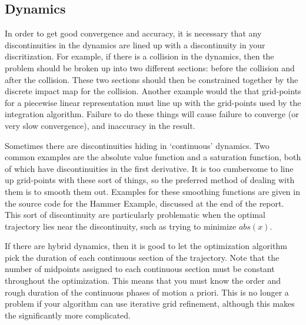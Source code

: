 \subsection {Dynamics}

In order to get good convergence and accuracy, it is necessary that any discontinuities in the dynamics are lined up with a discontinuity in your discritization. For example, if there is a collision in the dynamics, then the problem should be broken up into two different sections: before the collision and after the collision. These two sections should then be constrained together by the discrete impact map for the collision. Another example would the that grid-points for a piecewise linear representation must line up with the grid-points used by the integration algorithm. Failure to do these things will cause failure to converge (or very slow convergence), and inaccuracy in the result.

\par Sometimes there are discontinuities hiding in `continuous' dynamics. Two common examples are the absolute value function and a saturation function, both of which have discontinuities in the first derivative. It is too cumbersome to line up grid-points with these sort of things, so the preferred method of dealing with them is to smooth them out. Examples for these smoothing functions are given in the source code for the Hammer Example, discussed at the end of the report. This sort of discontinuity are particularly problematic when the optimal trajectory lies near the discontinuity, such as trying to minimize $abs(x)$.

\par If there are hybrid dynamics, then it is good to let the optimization algorithm pick the duration of each continuous section of the trajectory. Note that the number of midpoints assigned to each continuous section must be constant throughout the optimization. This means that you must know the order and rough duration of the continuous phases of motion a priori. This is no longer a problem if your algorithm can use iterative grid refinement, although this makes the significantly more complicated.
